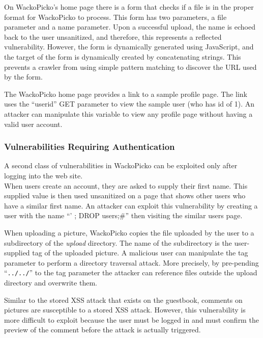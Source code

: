 On WackoPicko's home page there is a form that checks if a file is in the proper
format for WackoPicko to process. This form has two parameters, a file
parameter and a name parameter. Upon a successful upload, the name is echoed
back to the user unsanitized, and therefore, this represents a
reflected vulnerability.
However, the form is dynamically generated using JavaScript, and the target of
the form is dynamically created by concatenating strings. This prevents
a crawler from using simple pattern matching to discover the URL
used by the form.

The WackoPicko home page provides a
link to a sample profile page. The link uses the ``userid'' GET parameter to view
the sample user (who has id of 1). An attacker can manipulate this variable
to view any profile page without having a valid user account.

\subsubsection{Vulnerabilities Requiring Authentication}
A second class of vulnerabilities in WackoPicko can be exploited only
after logging into the web site.\\


When users create an account, they are asked to supply their first name.
This supplied value is then used unsanitized on a page that shows other users who have a
similar first name. An attacker can exploit this vulnerability by
creating a user with the name ``' ; DROP users;\#'' then visiting the
similar users page.


When uploading a picture, WackoPicko copies the file uploaded by the user to a
subdirectory of the \emph{upload} directory. The name of the subdirectory is the
user-supplied tag of the uploaded picture. A malicious user can manipulate the
tag parameter to perform a directory traversal attack. More precisely, by
pre-pending ``{\tt../../}'' to the tag parameter the attacker can reference files outside
the upload directory and overwrite them.

Similar to the stored XSS attack that exists on the guestbook, comments on
pictures are susceptible to a stored XSS attack. However, this vulnerability
is more difficult to exploit because the user must be logged in and must
confirm the preview of the comment before the attack is actually triggered.

